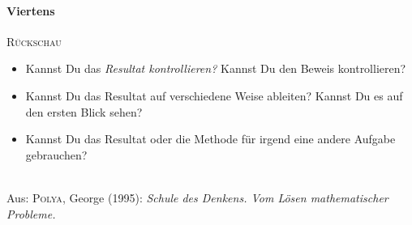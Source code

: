 \paragraph{Viertens}\textsc{Rückschau}
\begin{itemize}
  \renewcommand{\itemsep}{-0.5ex}
  \item Kannst Du das \textit{Resultat kontrollieren?} Kannst Du den Beweis kontrollieren?
  \item Kannst Du das Resultat auf verschiedene Weise ableiten? Kannst Du es auf den ersten
        Blick sehen?
  \item Kannst Du das Resultat oder die Methode für irgend eine andere Aufgabe gebrauchen?
\end{itemize}

\hrulefill\\
Aus: \textsc{Polya}, George (1995): \textit{Schule des Denkens. Vom Lösen mathematischer Probleme.}
\endgroup
